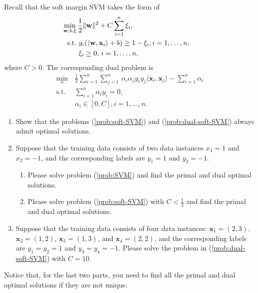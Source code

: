 \documentclass[11pt,letter,notitlepage]{article}
\begin{document}
\newpage
\begin{exercise}
	Recall that the soft margin SVM takes the form of
	\begin{align}\label{prob:soft-SVM}
		\min_{\mathbf{w},b,\xi}\, & \frac{1}{2}\|\mathbf{w}\|^2+C\sum_{i=1}^n\xi_i,                           \\ \nonumber
		{\rm s.t.\,}              & \,y_i(\langle\mathbf{w},\mathbf{x}_i\rangle+b)\geq1-\xi_i,i=1,\ldots,n, & \\ \nonumber
		                          & \,\xi_i\geq0,\,i=1,\ldots,n,
	\end{align}
	where $C>0$.
	The corresponding dual problem is
	\begin{align}\label{prob:dual-soft-SVM}
		\min_{\alpha}\, & \frac{1}{2}\sum_{i=1}^n\sum_{j=1}^n\,\alpha_i\alpha_jy_iy_j\langle\mathbf{x}_i,\mathbf{x}_j\rangle-\sum_{i=1}^n\alpha_i \\\nonumber
		\mbox{s.t. }\,  & \sum_{i=1}^n\alpha_iy_i=0,                                                                                              \\\nonumber
		                & \alpha_i\in[0,C],i=1,\ldots,n.
	\end{align}
	\begin{enumerate}
		\item Show that the problems (\ref{prob:soft-SVM}) and (\ref{prob:dual-soft-SVM}) always admit optimal solutions.

		\item Suppose that the training data consists of two data instances $x_1=1$ and $x_2=-1$, and the corresponding labels are $y_1=1$ and $y_2=-1$.
		      \begin{enumerate}
			      \item Please solve problem (\ref{prob:SVM}) and find the primal and dual optimal solutions.
			      \item Please solve problem (\ref{prob:soft-SVM}) with $C<\frac{1}{2}$ and find the primal and dual optimal solutions.
		      \end{enumerate}

		\item Suppose that the training data consists of four data instances: $\mathbf{x}_1=(2,3)$, $\mathbf{x}_2=(1,2)$, $\mathbf{x}_3=(1,3)$, and $\mathbf{x}_4=(2,2)$, and the corresponding labels are $y_1=y_2=1$ and $y_3=y_4=-1$. Please solve the problem in (\ref{prob:dual-soft-SVM}) with $C=10$.
	\end{enumerate}
	Notice that, for the last two parts, you need to find all the primal and dual optimal solutions if they are not unique.
\end{exercise}

\end{document}
